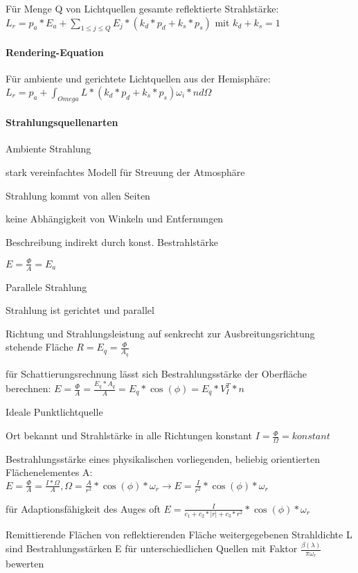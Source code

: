 \documentclass[landscape]{article}
\begin{document}
\begin{multicols}{3}
  Für Menge Q von Lichtquellen gesamte reflektierte Strahlstärke: $L_r=p_a*E_a+\sum_{1\leq j \leq Q} E_j * (k_d*p_d + k_s*p_s)$ mit $k_d+k_s=1$
  
  \paragraph{Rendering-Equation}
  Für ambiente und gerichtete Lichtquellen aus der Hemisphäre: 
  $L_r=p_a + \int_{Omega} L*(k_d*p_d+k_s*p_s) \omega_i*n d\Omega$
  
  \paragraph{Strahlungsquellenarten}
  \begin{description*}
    \item[Ambiente Strahlung]
    \begin{itemize*}
      \item stark vereinfachtes Modell für Streuung der Atmosphäre
      \item Strahlung kommt von allen Seiten
      \item keine Abhängigkeit von Winkeln und Entfernungen
      \item Beschreibung indirekt durch konst. Bestrahlstärke
      \item $E=\frac{\Phi}{A}=E_a$
    \end{itemize*}
    \item[Parallele Strahlung]
    \begin{itemize*}
      \item Strahlung ist gerichtet und parallel
      \item Richtung und Strahlungsleistung auf senkrecht zur Ausbreitungsrichtung stehende Fläche $R=E_q=\frac{\Phi}{A_q}$
      \item für Schattierungsrechnung lässt sich Bestrahlungsstärke der Oberfläche berechnen: $E=\frac{\Phi}{A}=\frac{E_q*A_q}{A}=E_q*\cos(\phi) = E_q*V_I^T*n$
    \end{itemize*}
    \item[Ideale Punktlichtquelle]
    \begin{itemize*}
      \item Ort bekannt und Strahlstärke in alle Richtungen konstant $I=\frac{\Phi}{\Omega}=konstant$
      \item Bestrahlungsstärke eines physikalischen vorliegenden, beliebig orientierten Flächenelementes A: $E=\frac{\Phi}{A}=\frac{I*\Omega}{A}, \Omega=\frac{A}{r^2}*\cos(\phi)*\omega_r \rightarrow E=\frac{I}{r^2}*\cos(\phi)*\omega_r$
      \item für Adaptionsfähigkeit des Auges oft $E=\frac{I}{c_1+c_2*|r|+c_3*r^2}*\cos(\phi)*\omega_r$
    \end{itemize*}
    \item[Remittierende Flächen] von reflektierenden Fläche weitergegebenen Strahldichte L sind Bestrahlungsstärken E für unterschiedlichen Quellen mit Faktor $\frac{\beta(\lambda)}{\pi\omega_r}$ bewerten
  \end{description*}
  

\end{multicols}
\end{document}
